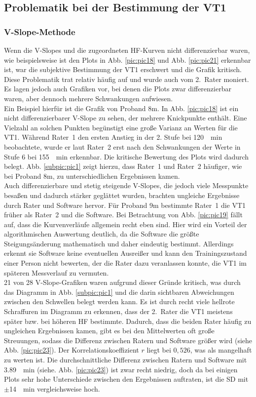 \subsection{Problematik bei der Bestimmung der VT1}
%
\subsubsection{V-Slope-Methode}
%
Wenn die V-Slopes und die zugeordneten \gls{HF}-Kurven nicht differenzierbar waren, wie beispielsweise ist den Plots in Abb. \ref{pic:pic18} und Abb. \ref{pic:pic21} erkennbar ist, war die subjektive Bestimmung der VT1 erschwert und die Grafik kritisch. Diese Problematik trat relativ häufig auf und wurde auch vom 2.~Rater moniert. Es lagen jedoch auch Grafiken vor, bei denen die Plots zwar differenzierbar waren, aber dennoch mehrere Schwankungen aufwiesen.\\
Ein Beispiel hierfür ist die Grafik von Proband 8m. In Abb. \ref{pic:pic18} ist ein nicht differenzierbarer V-Slope zu sehen, der mehrere Knickpunkte enthält. Eine Vielzahl an solchen Punkten begünstigt eine große Varianz an Werten für die VT1. Während Rater~1 den ersten Anstieg in der 2. Stufe bei \SI{120}{\per\minute} beobachtete, wurde er laut Rater~2 erst nach den Schwankungen der Werte in Stufe 6 bei \SI{155}{\per\minute} erkennbar. Die kritische Bewertung des Plots wird dadurch belegt. Abb. \ref{subpic:pic1} zeigt hierzu, dass Rater~1 und Rater~2 häufiger, wie bei Proband 8m, zu unterschiedlichen Ergebnissen kamen.\\
Auch differenzierbare und stetig steigende V-Slopes, die jedoch viele Messpunkte besaßen und dadurch stärker geglättet wurden, brachten ungleiche Ergebnisse durch Rater und Software hervor. Für Proband 9m bestimmte Rater~1 die VT1 früher als Rater~2 und die Software. Bei Betrachtung von Abb. \ref{pic:pic19} fällt auf, dass die Kurvenverläufe allgemein recht eben sind. Hier wird ein Vorteil der algorithmischen Auswertung deutlich, da die Software die größte Steigungsänderung mathematisch und daher eindeutig bestimmt. Allerdings erkennt sie Software keine eventuellen Ausreißer und kann den Trainingszustand einer Person nicht bewerten, der die Rater dazu veranlassen konnte, die VT1 im späteren Messverlauf zu vermuten.\\
21 von 28 V-Slope-Grafiken waren aufgrund dieser Gründe kritisch, was durch das Diagramm in Abb. \ref{subpic:pic1} und die darin sichtbaren Abweichungen zwischen den Schwellen belegt werden kann. Es ist durch recht viele hellrote Schraffuren im Diagramm zu erkennen, dass der 2.~Rater die VT1 meistens später bzw. bei höheren \gls{HF} bestimmte. Dadurch, dass die beiden Rater häufig zu ungleichen Ergebnissen kamen, gibt es bei den Mittelwerten oft große Streuungen, sodass die Differenz zwischen Ratern und Software größer wird (siehe Abb. \ref{pic:pic23}). Der Korrelationskoeffizient $r$ liegt bei $0,526$, was als mangelhaft zu werten ist. Die durchschnittliche Differenz zwischen Ratern und Software mit \SI{3,89}{\per\minute} (siehe. Abb. \ref{pic:pic23}) ist zwar recht niedrig, doch da bei einigen Plots sehr hohe Unterschiede zwischen den Ergebnissen auftraten, ist die \gls{SD} mit $\pm$\SI{14}{\per\minute} vergleichsweise hoch.
%
